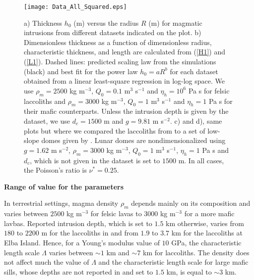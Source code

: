 \begin{figure}[h!]
  \begin{center}
    \graphicspath{ {/Users/thorey/Documents/These/Projet/Refroidissement/Skin_Model/Figure/Figure_Data/} }
    \texttt{[image: Data\_All\_Squared.eps]}
    \caption{a)  Thickness $h_0$  (m) versus  the radius  $R$ (m)  for
      magmatic  intrusions from  different datasets  indicated on  the
      plot. b) Dimensionless thickness  as a function of dimensionless
      radius, characteristic thickness, and length are calculated from
      (\ref{H1}) and (\ref{L1}).  Dashed  lines: predicted scaling law
      from  the simulations  (black) and  best fit  for the  power law
      $h_0=aR^b$ for each dataset  obtained from a linear least-square
      regression in log-log space.   We use $\rho_m=2500$ kg m$^{-3}$,
      $Q_0  =0.1$ m$^3$  s$^{-1}$ and  $\eta_h=10^6$ Pa  s for  felsic
      laccoliths  and  $\rho_m=3000$  kg   m$^{-3}$,  $Q_0  =1$  m$^3$
      s$^{-1}$  and  $\eta_h=1$ Pa  s  for  their mafic  counterparts.
      Unless  the intrusion  depth is  given  by the  dataset, we  use
      $d_c=1500$ m and $g=9.81$ m s$^{-2}$.  c) and d), same plots but
      where we compared the laccoliths from \citep{Rocchi:2002jy} to a
      set of  low-slope domes  given by  \citet{Wohler:2009jj}.  Lunar
      domes   are  nondimensionalized   using  $g=1.62$   m  s$^{-2}$,
      $\rho_m=3000$ kg  m$^{-3}$, $Q_0 =1$ m$^3$  s$^{-1}$, $\eta_h=1$
      Pa s  and $d_c$,  which is not  given in the  dataset is  set to
      $1500$ m.  In all cases, the Poisson's ratio is $\nu^*=0.25$.}
    \label{Corry_Rocchie}
  \end{center}
\end{figure}



\vspace{.5cm} \textbf{Range of value for the parameters} \vspace{.5cm}

In terrestrial settings, magma density  $\rho_m$ depends mainly on its
composition and varies between $ 2500$ kg m$^{-3}$ for felsic lavas to
$3000$ kg m$^{-3}$ for a more mafic lavbas.  Reported intrusion depth,
which is set to $1.5$ km otherwise,  varies from $180$ to $2200$ m for
the laccoliths in \citet{E:2015tl} and from  $1.9$ to $3.7$ km for the
laccoliths at Elba Island.  Hence, for a Young's modulus value of $10$
GPa, the characteristic length scale $\Lambda$ varies between $\sim 1$
km and $\sim  7$ km for laccoliths.  The density  does not affect much
the value of  $\Lambda$ and the characteristic length  scale for large
mafic sills,  whose depths are  not reported in  \citet{Cruden:tg} and
set to $1.5$ km, is equal to $\sim 3$ km.

